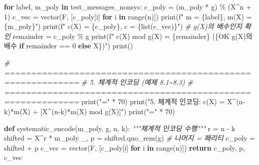 \documentclass[
  oneside]{article}
\newenvironment{Shaded}{}{}
\newcommand{\BuiltInTok}[1]{\textcolor[rgb]{0.00,0.50,0.00}{#1}}
\newcommand{\CommentTok}[1]{\textcolor[rgb]{0.38,0.63,0.69}{\textit{#1}}}
\newcommand{\ControlFlowTok}[1]{\textcolor[rgb]{0.00,0.44,0.13}{\textbf{#1}}}
\newcommand{\DecValTok}[1]{\textcolor[rgb]{0.25,0.63,0.44}{#1}}
\newcommand{\KeywordTok}[1]{\textcolor[rgb]{0.00,0.44,0.13}{\textbf{#1}}}
\newcommand{\NormalTok}[1]{#1}
\newcommand{\OperatorTok}[1]{\textcolor[rgb]{0.40,0.40,0.40}{#1}}
\newcommand{\SpecialCharTok}[1]{\textcolor[rgb]{0.25,0.44,0.63}{#1}}
\newcommand{\SpecialStringTok}[1]{\textcolor[rgb]{0.73,0.40,0.53}{#1}}
\newcommand{\StringTok}[1]{\textcolor[rgb]{0.25,0.44,0.63}{#1}}
\begin{document}
\begin{Shaded}
\begin{Highlighting}[]
\ControlFlowTok{for}\NormalTok{ label, m\_poly }\KeywordTok{in}\NormalTok{ test\_messages\_nonsys:}
\NormalTok{    c\_poly }\OperatorTok{=}\NormalTok{ (m\_poly }\OperatorTok{*}\NormalTok{ g) }\OperatorTok{\%}\NormalTok{ (X}\OperatorTok{\^{}}\NormalTok{n }\OperatorTok{+} \DecValTok{1}\NormalTok{)}
\NormalTok{    c\_vec }\OperatorTok{=}\NormalTok{ vector(F, [c\_poly[i] }\ControlFlowTok{for}\NormalTok{ i }\KeywordTok{in} \BuiltInTok{range}\NormalTok{(n)])}
    \BuiltInTok{print}\NormalTok{(}\SpecialStringTok{f"  m = }\SpecialCharTok{\{}\NormalTok{label}\SpecialCharTok{\}}\SpecialStringTok{,  m(X) = }\SpecialCharTok{\{}\NormalTok{m\_poly}\SpecialCharTok{\}}\SpecialStringTok{"}\NormalTok{)}
    \BuiltInTok{print}\NormalTok{(}\SpecialStringTok{f"  c(X) = }\SpecialCharTok{\{}\NormalTok{c\_poly}\SpecialCharTok{\}}\SpecialStringTok{,  c = }\SpecialCharTok{\{}\BuiltInTok{list}\NormalTok{(c\_vec)}\SpecialCharTok{\}}\SpecialStringTok{"}\NormalTok{)}
    \CommentTok{\# g(X)의 배수인지 확인}
\NormalTok{    remainder }\OperatorTok{=}\NormalTok{ c\_poly }\OperatorTok{\%}\NormalTok{ g}
    \BuiltInTok{print}\NormalTok{(}\SpecialStringTok{f"  c(X) mod g(X) = }\SpecialCharTok{\{}\NormalTok{remainder}\SpecialCharTok{\}}\SpecialStringTok{  (}\SpecialCharTok{\{}\StringTok{\textquotesingle{}OK g(X)의 배수\textquotesingle{}} \ControlFlowTok{if}\NormalTok{ remainder }\OperatorTok{==} \DecValTok{0} \ControlFlowTok{else} \StringTok{\textquotesingle{}X\textquotesingle{}}\SpecialCharTok{\}}\SpecialStringTok{)"}\NormalTok{)}
    \BuiltInTok{print}\NormalTok{()}

\CommentTok{\# ============================================================}
\CommentTok{\# 5. 체계적 인코딩 (예제 8.1\textasciitilde{}8.3)}
\CommentTok{\# ============================================================}
\BuiltInTok{print}\NormalTok{(}\StringTok{"="} \OperatorTok{*} \DecValTok{70}\NormalTok{)}
\BuiltInTok{print}\NormalTok{(}\StringTok{"5. 체계적 인코딩: c(X) = X\^{}(n{-}k)*m(X) + [X\^{}(n{-}k)*m(X) mod g(X)]"}\NormalTok{)}
\BuiltInTok{print}\NormalTok{(}\StringTok{"="} \OperatorTok{*} \DecValTok{70}\NormalTok{)}

\KeywordTok{def}\NormalTok{ systematic\_encode(m\_poly, g, n, k):}
    \CommentTok{"""체계적 인코딩 수행"""}
\NormalTok{    r }\OperatorTok{=}\NormalTok{ n }\OperatorTok{{-}}\NormalTok{ k}
\NormalTok{    shifted }\OperatorTok{=}\NormalTok{ X}\OperatorTok{\^{}}\NormalTok{r }\OperatorTok{*}\NormalTok{ m\_poly}
\NormalTok{    \_, p }\OperatorTok{=}\NormalTok{ shifted.quo\_rem(g)  }\CommentTok{\# 나머지 = 패리티}
\NormalTok{    c\_poly }\OperatorTok{=}\NormalTok{ shifted }\OperatorTok{+}\NormalTok{ p}
\NormalTok{    c\_vec }\OperatorTok{=}\NormalTok{ vector(F, [c\_poly[i] }\ControlFlowTok{for}\NormalTok{ i }\KeywordTok{in} \BuiltInTok{range}\NormalTok{(n)])}
    \ControlFlowTok{return}\NormalTok{ c\_poly, p, c\_vec}


\end{Highlighting}
\end{Shaded}
\end{document}

